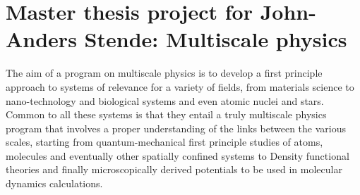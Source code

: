 \documentclass[10pt]{article}
\begin{document}
\section*{Master thesis project for John-Anders Stende: Multiscale physics}

The aim of a program on multiscale physics is to develop a first
principle approach to systems of relevance for a variety of fields,
from materials science to nano-technology and biological systems and
even atomic nuclei and stars.  Common to all these systems is that
they entail a truly multiscale physics program that involves a proper
understanding of the links between the various scales, starting from
quantum-mechanical first principle studies of atoms, molecules and
eventually other spatially confined systems to Density functional
theories and finally microscopically derived potentials to be used in
molecular dynamics calculations.
\end{document}
